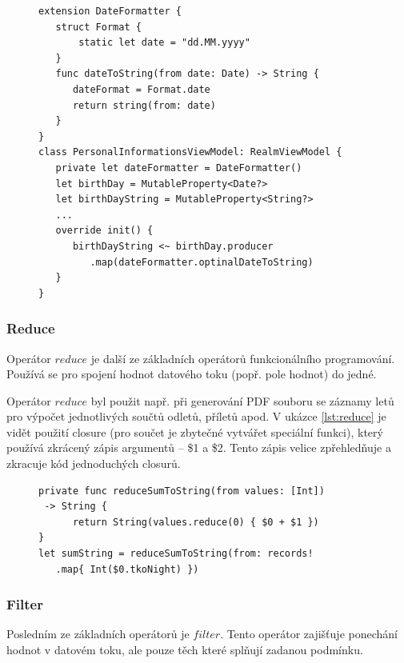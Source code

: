 \documentclass[thesis=M,czech]{FITthesis}[2012/06/26]
\begin{document}
\begin{figure}
\begin{minipage}{\linewidth}
\begin{lstlisting}[caption={Ukázka použití Map},label={lst:map}]
extension DateFormatter {
   struct Format {
       static let date = "dd.MM.yyyy"
   }
   func dateToString(from date: Date) -> String {
      dateFormat = Format.date
      return string(from: date)
   }
}
class PersonalInformationsViewModel: RealmViewModel {
   private let dateFormatter = DateFormatter()
   let birthDay = MutableProperty<Date?>
   let birthDayString = MutableProperty<String?>
   ...
   override init() {
      birthDayString <~ birthDay.producer
         .map(dateFormatter.optinalDateToString)
   }
}
\end{lstlisting}
\end{minipage}
\end{figure}	

\subsubsection{Reduce}
Operátor $reduce$ je další ze základních operátorů funkcionálního programování. Používá se pro spojení hodnot datového toku (popř. pole hodnot) do jedné. \cite{operators}

Operátor $reduce$ byl použit např. při generování PDF souboru se záznamy letů pro výpočet jednotlivých součtů odletů, příletů apod. V ukázce \ref{lst:reduce} je vidět použití closure (pro součet je zbytečné vytvářet speciální funkci), který používá zkrácený zápis argumentů -- \$1 a \$2. Tento zápis velice zpřehledňuje a zkracuje kód jednoduchých closurů.

\begin{figure}
\begin{minipage}{\linewidth}
\begin{lstlisting}[caption={Ukázka použití Reduce},label={lst:reduce}]
private func reduceSumToString(from values: [Int])
 -> String {
      return String(values.reduce(0) { $0 + $1 })
}
let sumString = reduceSumToString(from: records!
   .map{ Int($0.tkoNight) })
\end{lstlisting}
\end{minipage}
\end{figure}

\subsubsection{Filter}
Posledním ze základních operátorů je $filter$. Tento operátor zajišťuje ponechání hodnot v datovém toku, ale pouze těch které splňují zadanou podmínku.\cite{operators}
\end{document}
